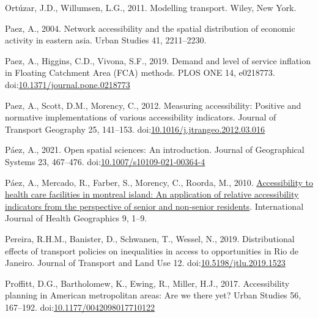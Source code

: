 \documentclass[]{elsarticle} %
\newlength{\cslhangindent}
\newlength{\cslentryspacingunit} %
\newenvironment{CSLReferences}[2] %
 {%
  \setlength{\parindent}{0pt}
  \ifodd #1
  \let\oldpar\par
  \def\par{\hangindent=\cslhangindent\oldpar}
  \fi
  \setlength{\parskip}{#2\cslentryspacingunit}
 }%
 {}
\begin{document}
\begin{CSLReferences}{1}{0}
\leavevmode{}%
Ortúzar, J.D., Willumsen, L.G., 2011. Modelling transport. Wiley, New
York.

\leavevmode{}%
Paez, A., 2004. Network accessibility and the spatial distribution of
economic activity in eastern asia. Urban Studies 41, 2211--2230.

\leavevmode{}%
Paez, A., Higgins, C.D., Vivona, S.F., 2019. Demand and level of service
inflation in Floating Catchment Area (FCA) methods. PLOS ONE 14,
e0218773.
doi:\href{https://doi.org/10.1371/journal.pone.0218773}{10.1371/journal.pone.0218773}

\leavevmode{}%
Paez, A., Scott, D.M., Morency, C., 2012. Measuring accessibility:
Positive and normative implementations of various accessibility
indicators. Journal of Transport Geography 25, 141--153.
doi:\href{https://doi.org/10.1016/j.jtrangeo.2012.03.016}{10.1016/j.jtrangeo.2012.03.016}

\leavevmode{}%
Páez, A., 2021. Open spatial sciences: An introduction. Journal of
Geographical Systems 23, 467--476.
doi:\href{https://doi.org/10.1007/s10109-021-00364-4}{10.1007/s10109-021-00364-4}

\leavevmode{}%
Páez, A., Mercado, R., Farber, S., Morency, C., Roorda, M., 2010.
\href{http://www.ij-healthgeographics.com/content/9/1/52}{Accessibility
to health care facilities in montreal island: An application of relative
accessibility indicators from the perspective of senior and non-senior
residents}. International Journal of Health Geographics 9, 1--9.

\leavevmode{}%
Pereira, R.H.M., Banister, D., Schwanen, T., Wessel, N., 2019.
Distributional effects of transport policies on inequalities in access
to opportunities in {Rio} de {Janeiro}. Journal of Transport and Land
Use 12.
doi:\href{https://doi.org/10.5198/jtlu.2019.1523}{10.5198/jtlu.2019.1523}

\leavevmode{}%
Proffitt, D.G., Bartholomew, K., Ewing, R., Miller, H.J., 2017.
Accessibility planning in American metropolitan areas: Are we there yet?
Urban Studies 56, 167--192.
doi:\href{https://doi.org/10.1177/0042098017710122}{10.1177/0042098017710122}


\end{CSLReferences}
\end{document}
